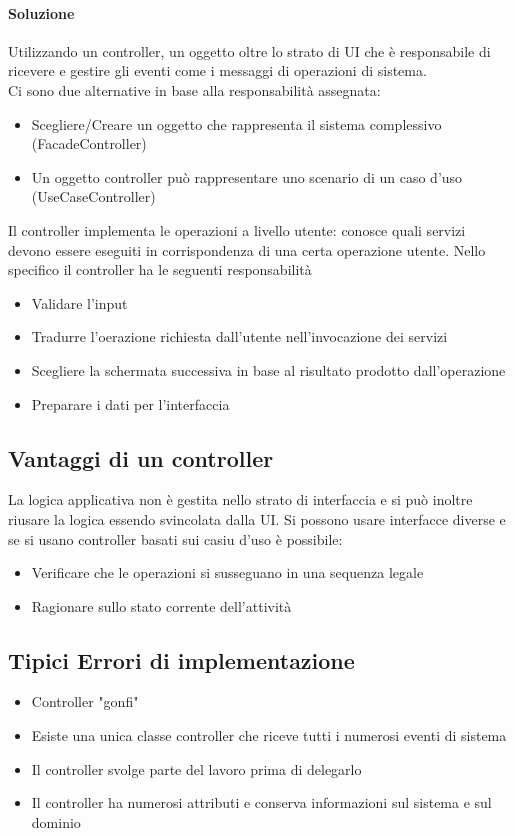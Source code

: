 \paragraph*{Soluzione} Utilizzando un controller, un oggetto oltre lo strato di UI che è 
responsabile di ricevere e gestire gli eventi come i messaggi di operazioni di sistema.
\\ Ci sono due alternative in base alla responsabilità assegnata:
\begin{itemize}
    \item Scegliere/Creare un oggetto che rappresenta il sistema complessivo (FacadeController)
    \item Un oggetto controller può rappresentare uno scenario di un caso d'uso (UseCaseController)
\end{itemize}
Il controller implementa le operazioni a livello utente: conosce quali servizi devono
essere eseguiti in corrispondenza di una certa operazione utente.
Nello specifico il controller ha le seguenti responsabilità
\begin{itemize}
    \item Validare l'input
    \item Tradurre l'oerazione richiesta dall'utente nell'invocazione dei servizi
    \item Scegliere la schermata successiva in base al risultato prodotto dall'operazione
    \item Preparare i dati per l'interfaccia
\end{itemize}
\subsection*{Vantaggi di un controller}
La logica applicativa non è gestita nello strato di interfaccia e si può inoltre
riusare la logica essendo svincolata dalla UI. Si possono usare interfacce diverse e se si usano
controller basati sui casiu d'uso è possibile:
\begin{itemize}
    \item Verificare che le operazioni si susseguano in una sequenza legale
    \item Ragionare sullo stato corrente dell'attività
\end{itemize}
\subsection*{Tipici Errori di implementazione}
\begin{itemize}
    \item Controller "gonfi"
    \item Esiste una unica classe controller che riceve tutti i numerosi eventi di sistema
    \item Il controller svolge parte del lavoro prima di delegarlo
    \item Il controller ha numerosi attributi e conserva informazioni sul sistema e sul dominio
\end{itemize}
